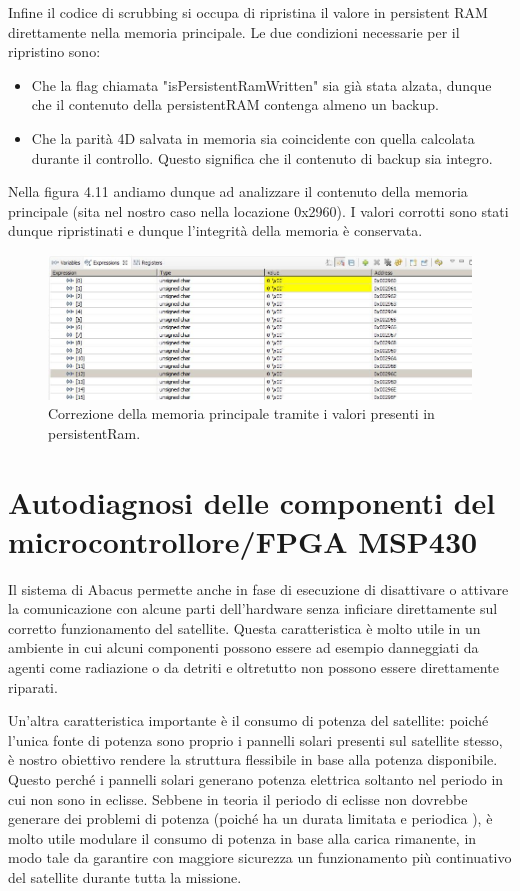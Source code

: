 \documentclass[LaM,binding=0.6cm]{../sapthesis}
\begin{document}
Infine il codice di scrubbing si occupa di ripristina il valore in persistent RAM direttamente nella memoria principale.
Le due condizioni necessarie per il ripristino sono:
\begin{itemize}
    \item Che la flag chiamata "isPersistentRamWritten" sia già stata alzata, dunque che il contenuto della persistentRAM contenga almeno un backup.
    
    \item Che la parità 4D salvata in memoria sia coincidente con quella calcolata durante il controllo. Questo significa che il contenuto di backup sia integro.
    
\end{itemize}
Nella figura 4.11 andiamo dunque ad analizzare il contenuto della memoria principale (sita nel nostro caso nella locazione 0x2960). I valori corrotti sono stati dunque ripristinati e dunque l'integrità della memoria è conservata.
\begin{figure}[htbp]
\centerline{\includegraphics[scale=0.6]{examples/7_CorrezioneMemory.JPG}}
\caption{Correzione della memoria principale tramite i valori presenti in persistentRam.}
\label{fig}
\end{figure}
\vspace{0.5cm}

\chapter{Autodiagnosi delle componenti del microcontrollore/FPGA MSP430}

Il sistema di Abacus permette anche in fase di esecuzione di disattivare o attivare la comunicazione con alcune parti dell’hardware senza inficiare direttamente sul corretto funzionamento del satellite. 
Questa caratteristica è molto utile in un ambiente in cui alcuni componenti possono essere ad esempio danneggiati da agenti come radiazione o da detriti e oltretutto non possono essere direttamente riparati. 

Un’altra caratteristica importante è il consumo di potenza del satellite: poiché l’unica fonte di potenza sono proprio i pannelli solari presenti sul satellite stesso, è nostro obiettivo rendere la struttura flessibile in base alla potenza disponibile. 
Questo perché i pannelli solari generano potenza elettrica soltanto nel periodo in cui non sono in eclisse. Sebbene in teoria il periodo di eclisse non dovrebbe generare dei problemi di potenza (poiché ha un durata limitata e periodica ), è molto utile modulare il consumo di potenza in base alla carica rimanente, in modo tale da garantire con maggiore sicurezza un funzionamento più continuativo del satellite durante tutta la missione.
\end{document}
